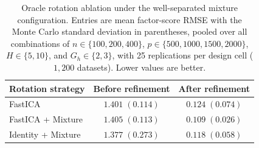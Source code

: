 \begin{table}[t]
\centering
\caption{Oracle rotation ablation under the well-separated mixture configuration. Entries are mean factor-score RMSE with the Monte Carlo standard deviation in parentheses, pooled over all combinations of $n\in\{100,200,400\}$, $p\in\{500,1000,1500,2000\}$, $H\in\{5,10\}$, and $G_h\in\{2,3\}$, with 25 replications per design cell ($1{,}200$ datasets). Lower values are better.}
\label{tab:rotation_ablation_separated}
\begin{tabular}{lcc}
\toprule
Rotation strategy & Before refinement & After refinement \\
\midrule
FastICA             & $1.401\;(0.114)$ & $0.124\;(0.074)$ \\
FastICA + Mixture   & $1.405\;(0.113)$ & $\mathbf{0.109}\;(\mathbf{0.026})$ \\
Identity + Mixture  & $1.377\;(0.273)$ & $0.118\;(0.058)$ \\
\bottomrule
\end{tabular}
\end{table}
